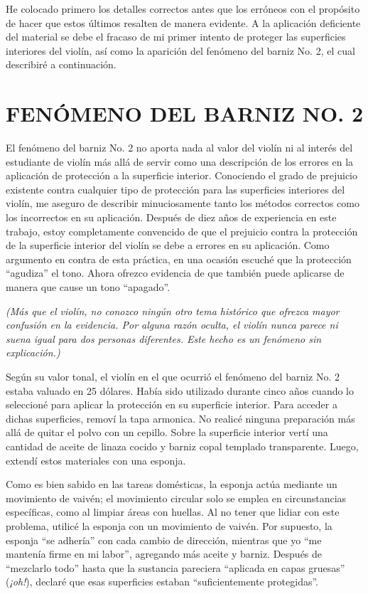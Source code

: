 \documentclass[12pt]{book}
\begin{document}
He colocado primero los detalles correctos antes que los erróneos con el propósito de hacer que estos últimos resalten de manera evidente. A la aplicación deficiente del material se debe el fracaso de mi primer intento de proteger las superficies interiores del violín, así como la aparición del fenómeno del barniz No. 2, el cual describiré a continuación.

\section*{FENÓMENO DEL BARNIZ NO. 2}

El fenómeno del barniz No. 2 no aporta nada al valor del violín ni al interés del estudiante de violín más allá de servir como una descripción de los errores en la aplicación de protección a la superficie interior. Conociendo el grado de prejuicio existente contra cualquier tipo de protección para las superficies interiores del violín, me aseguro de describir minuciosamente tanto los métodos correctos como los incorrectos en su aplicación. Después de diez años de experiencia en este trabajo, estoy completamente convencido de que el prejuicio contra la protección de la superficie interior del violín se debe a errores en su aplicación. Como argumento en contra de esta práctica, en una ocasión escuché que la protección ``agudiza'' el tono. Ahora ofrezco evidencia de que también puede aplicarse de manera que cause un tono ``apagado''.

\textit{(Más que el violín, no conozco ningún otro tema histórico que ofrezca mayor confusión en la evidencia. Por alguna razón oculta, el violín nunca parece ni suena igual para dos personas diferentes. Este hecho es un fenómeno sin explicación.)}

Según su valor tonal, el violín en el que ocurrió el fenómeno del barniz No. 2 estaba valuado en 25 dólares. Había sido utilizado durante cinco años cuando lo seleccioné para aplicar la protección en su superficie interior. Para acceder a dichas superficies, removí la tapa armonica. No realicé ninguna preparación más allá de quitar el polvo con un cepillo. Sobre la superficie interior vertí una cantidad de aceite de linaza cocido y barniz copal templado transparente. Luego, extendí estos materiales con una esponja.

Como es bien sabido en las tareas domésticas, la esponja actúa mediante un movimiento de vaivén; el movimiento circular solo se emplea en circunstancias específicas, como al limpiar áreas con huellas. Al no tener que lidiar con este problema, utilicé la esponja con un movimiento de vaivén. Por supuesto, la esponja ``se adhería'' con cada cambio de dirección, mientras que yo ``me mantenía firme en mi labor'', agregando más aceite y barniz. Después de ``mezclarlo todo'' hasta que la sustancia pareciera ``aplicada en capas gruesas'' (\textit{¡oh!}), declaré que esas superficies estaban ``suficientemente protegidas''. 
\end{document}
